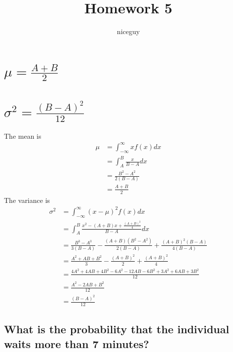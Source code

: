 \documentclass[answers]{exam}
\author{niceguy}
\title{Homework 5}
\begin{document}
\maketitle

\begin{questions}


\begin{parts}
	\part{$\mu = \frac{A+B}{2}$}
	\part{$\sigma^2 = \frac{(B-A)^2}{12}$}
\end{parts}

\begin{solution}
	The mean is
	\begin{align*}
		\mu &= \int_{-\infty}^\infty xf(x)dx \\
		    &= \int_A^B \frac{x}{B-A} dx \\
		    &= \frac{B^2-A^2}{2(B-A)} \\
		    &= \frac{A+B}{2}
	\end{align*}
	The variance is
	\begin{align*}
		\sigma^2 &= \int_{-\infty}^\infty (x-\mu)^2f(x)dx \\
			 &= \int_A^B \frac{x^2 - (A+B)x + \frac{(A+B)^2}{4}}{B-A}dx \\
			 &= \frac{B^3-A^3}{3(B-A)} - \frac{(A+B)(B^2-A^2)}{2(B-A)} + \frac{(A+B)^2(B-A)}{4(B-A)} \\
			 &= \frac{A^2+AB+B^2}{3} - \frac{(A+B)^2}{2} + \frac{(A+B)^2}{4} \\
			 &= \frac{4A^2+4AB+4B^2-6A^2-12AB-6B^2+3A^2+6AB+3B^2}{12} \\
			 &= \frac{A^2-2AB+B^2}{12} \\
			 &= \frac{(B-A)^2}{12}
	\end{align*}
\end{solution}


\begin{parts}
	\part{What is the probability that the individual waits more than 7 minutes?}

\end{parts}
\end{questions}
\end{document}
